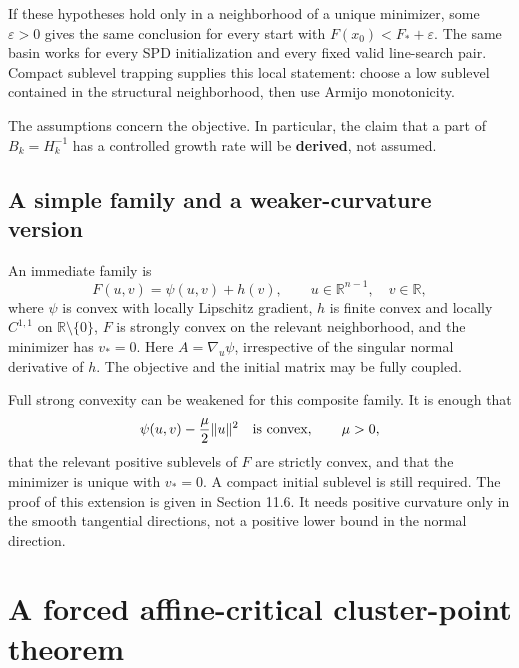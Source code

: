 If these hypotheses hold only in a neighborhood of a unique minimizer,
some \(\varepsilon>0\) gives the same conclusion for every start with
\(F(x_0)<F_*+\varepsilon\). The same basin works for every SPD
initialization and every fixed valid line-search pair. Compact sublevel
trapping supplies this local statement: choose a low sublevel contained
in the structural neighborhood, then use Armijo monotonicity.

The assumptions concern the objective. In particular, the claim that a
part of \(B_k=H_k^{-1}\) has a controlled growth rate will be
\textbf{derived}, not assumed.



\subsection{A simple family and a weaker-curvature
version}\label{U:a-simple-family-and-a-weaker-curvature-version}

An immediate family is \[
 \boxed{F(u,v)=\psi(u,v)+h(v),\qquad u\in\mathbb R^{n-1},\quad v\in\mathbb R,}
\] where \(\psi\) is convex with locally Lipschitz gradient, \(h\) is
finite convex and locally \(C^{1,1}\) on \(\mathbb R\setminus\{0\}\),
\(F\) is strongly convex on the relevant neighborhood, and the minimizer
has \(v_*=0\). Here \(A=\nabla_u\psi\), irrespective of the singular
normal derivative of \(h\). The objective and the initial matrix may be
fully coupled.

Full strong convexity can be weakened for this composite family. It is
enough that \[
 \psi(u,v)-\frac{\mu}{2}\|u\|^2\quad\hbox{is convex},\qquad \mu>0,
\] that the relevant positive sublevels of \(F\) are strictly convex,
and that the minimizer is unique with \(v_*=0\). A compact initial
sublevel is still required. The proof of this extension is given in
Section 11.6. It needs positive curvature only in the smooth tangential
directions, not a positive lower bound in the normal direction.


\setcounter{section}{1}
\setcounter{theorem}{0}
\setcounter{lemma}{0}
\setcounter{corollary}{0}
\setcounter{proposition}{0}
\setcounter{remark}{0}
\setcounter{equation}{0}


\section{A forced affine-critical cluster-point
theorem}\label{U:a-forced-affine-critical-cluster-point-theorem}


